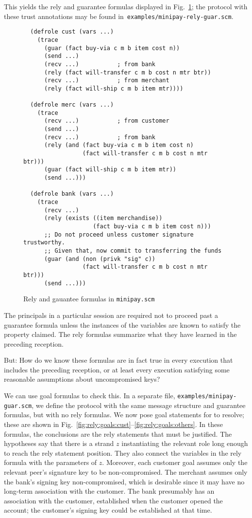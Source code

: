 This yields the rely and guarantee formulas displayed in
Fig.~\ref{fig:minipay:rely:guar}; the protocol with these trust
annotations may be found in~\texttt{examples/minipay-rely-guar.scm}.
%
\begin{figure}\small
\begin{verbatim}  (defrole cust (vars ...)
    (trace
      (guar (fact buy-via c m b item cost n))
      (send ...)
      (recv ...)           ; from bank
      (rely (fact will-transfer c m b cost n mtr btr))
      (recv ...)           ; from merchant
      (rely (fact will-ship c m b item mtr))))

  (defrole merc (vars ...)
    (trace
      (recv ...)           ; from customer
      (send ...)
      (recv ...)           ; from bank
      (rely (and (fact buy-via c m b item cost n)
                 (fact will-transfer c m b cost n mtr btr)))
      (guar (fact will-ship c m b item mtr))
      (send ...)))

  (defrole bank (vars ...)
    (trace
      (recv ...)
      (rely (exists ((item merchandise))
                    (fact buy-via c m b item cost n)))
      ;; Do not proceed unless customer signature trustworthy.
      ;; Given that, now commit to transferring the funds
      (guar (and (non (privk "sig" c))
                 (fact will-transfer c m b cost n mtr btr)))
      (send ...))) \end{verbatim}

  \caption[Minipay rely/guarantee formulas]{Rely and gauantee formulas
    in \texttt{minipay.scm}}
  \label{fig:minipay:rely:guar}
\end{figure}
%
The principals in a particular session are required not to proceed
past a guarantee formula unless the instances of the variables are
known to satisfy the property claimed.  The rely formulas summarize
what they have learned in the preceding reception.

But:  How do we know these formulas are in fact true in every
execution that includes the preceding reception, or at least every
execution satisfying some reasonable assumptions about uncompromised
keys?

We can use goal formulas to check this.  In a separate file,
\texttt{examples/minipay-guar.scm}, we define the protocol with the
same message structure and guarantee formulas, but with no rely
formulas.  We now pose goal statements for {\cpsa} to resolve; these
are shown in
Fig.~\ref{fig:rely:goals:cust}--\ref{fig:rely:goals:others}.  In these
formulas, the conclusions are the rely statements that must be
justified.  The hypotheses say that there is a strand $z$
instantiating the relevant role long enough to reach the rely
statement position.  They also connect the variables in the rely
formula with the parameters of $z$.  Moreover, each customer goal
assumes only the relevant peer's signature key to be non-compromised.
The merchant assumes only the bank's signing key non-compromised,
which is desirable since it may have no long-term association with the
customer.  The bank presumably has an association with the customer,
established when the customer opened the account; the customer's
signing key could be established at that time.

